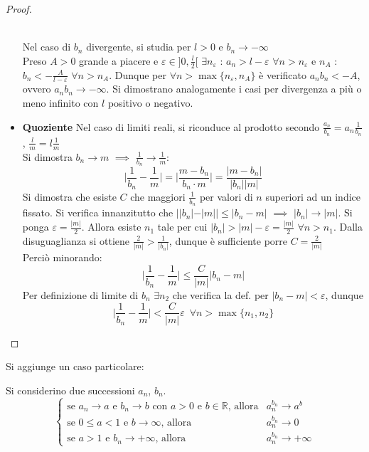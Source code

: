 \documentclass[10pt, oneside]{book}
\theoremstyle{plain}
\begin{document}
\begin{proof}
\begin{itemize}
    \\Nel caso di $b_n$ divergente, si studia per $l>0$ e $b_n \rightarrow -\infty$
    \\Preso $A>0$ grande a piacere e $\varepsilon \in ]0, \frac{l}{2}[$ $\exists n_\varepsilon$ : $a_n > l - \varepsilon$ $\forall n > n_\varepsilon$ e $n_A$ : $b_n < - \frac{A}{l - \varepsilon}$ $\forall n > n_A$.
    Dunque per $\forall n > \max \{n_\varepsilon, n_A\}$ è verificato $a_n b_n < -A$, ovvero $a_n b_n \rightarrow - \infty$. Si dimostrano analogamente i casi per divergenza a più o meno infinito con $l$ positivo o negativo.
    \item \textbf{Quoziente} Nel caso di limiti reali, si riconduce al prodotto secondo $\frac{a_n}{b_n} = a_n \frac{1}{b_n}$, $\frac{l}{m} = l \frac{1}{m}$
    \\Si dimostra $b_n \rightarrow m$ $\implies$ $\frac{1}{b_n} \rightarrow \frac{1}{m}$: 
    \[\bigg| \frac{1}{b_n} - \frac{1}{m}\bigg| = \bigg| \frac{m - b_n}{b_n \cdot m} \bigg| = \frac{|m - b_n|}{|b_n||m|}\]
    Si dimostra che esiste $C$ che maggiori $\frac{1}{b_n}$ per valori di $n$ superiori ad un indice fissato. Si verifica innanzitutto che $||b_n| - |m|| \leq |b_n - m|$ $\implies$ $|b_n| \rightarrow |m|$. Si ponga $\varepsilon = \frac{|m|}{2}$. Allora esiste $n_1$ tale per cui $|b_n| > |m| - \varepsilon = \frac{|m|}{2}$ $\forall n > n_1$. Dalla disuguaglianza si ottiene $\frac{2}{|m|} > \frac{1}{|b_n|}$, dunque è sufficiente porre $C = \frac{2}{|m|}$
    \\Perciò minorando:
    \[\bigg| \frac{1}{b_n} - \frac{1}{m}\bigg| \leq \frac{C}{|m|} |b_n - m|\]
    Per definizione di limite di $b_n$ $\exists n_2$ che verifica la def. per $|b_n - m| < \varepsilon$, dunque 
    \[\bigg| \frac{1}{b_n} - \frac{1}{m}\bigg| < \frac{C}{|m|}\varepsilon \enspace \forall n > \max \{n_1, n_2\}\]
    \end{itemize}
\end{proof}

Si aggiunge un caso particolare:
\begin{prop}
    Si considerino due successioni $a_n$, $b_n$.
        \[\begin{cases} \textrm{se $a_n \rightarrow a$ e $b_n \rightarrow b$ con $a > 0$ e $b \in \mathbb{R}$, allora} & 
        a_n^{b_n} \rightarrow a^b\\
        \textrm{se $0 \leq a < 1$ e $b \rightarrow \infty$, allora}
        & a_n^{b_n} \rightarrow 0\\
        \textrm{se $a > 1$ e $b_n \rightarrow + \infty$, allora}
        & a_n^{b_n} \rightarrow + \infty
    \end{cases}\]
\end{prop}
\end{document}
